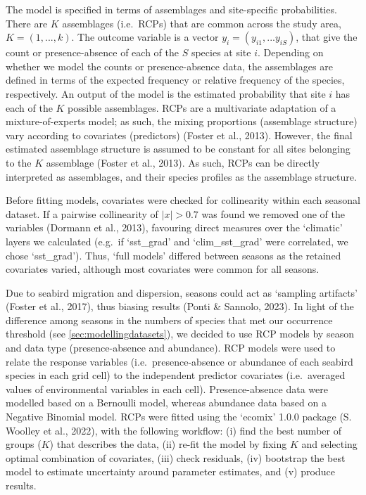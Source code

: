 \documentclass{article}
\begin{document}
The model is specified in terms of assemblages and site-specific probabilities. There are \(K\) assemblages (i.e.~RCPs) that are common across the study area, \(K = (1, ..., k)\). The outcome variable is a vector \(y_{i} = (y_{i1}, ... y_{iS})\), that give the count or presence-absence of each of the \(S\) species at site \(i\). Depending on whether we model the counts or presence-absence data, the assemblages are defined in terms of the expected frequency or relative frequency of the species, respectively. An output of the model is the estimated probability that site \(i\) has each of the \(K\) possible assemblages. RCPs are a multivariate adaptation of a mixture-of-experts model; as such, the mixing proportions (assemblage structure) vary according to covariates (predictors) (Foster et al., 2013). However, the final estimated assemblage structure is assumed to be constant for all sites belonging to the \(K\) assemblage (Foster et al., 2013). As such, RCPs can be directly interpreted as assemblages, and their species profiles as the assemblage structure.

Before fitting models, covariates were checked for collinearity within each seasonal dataset. If a pairwise collinearity of \(\left|x\right| >0.7\) was found we removed one of the variables (Dormann et al., 2013), favouring direct measures over the `climatic' layers we calculated (e.g.~if `sst\_grad' and `clim\_sst\_grad' were correlated, we chose `sst\_grad'). Thus, `full models' differed between seasons as the retained covariates varied, although most covariates were common for all seasons.

Due to seabird migration and dispersion, seasons could act as `sampling artifacts' (Foster et al., 2017), thus biasing results (Ponti \& Sannolo, 2023). In light of the difference among seasons in the numbers of species that met our occurrence threshold (see \ref{sec:modellingdatasets}), we decided to use RCP models by season and data type (presence-absence and abundance). RCP models were used to relate the response variables (i.e.~presence-absence or abundance of each seabird species in each grid cell) to the independent predictor covariates (i.e.~averaged values of environmental variables in each cell). Presence-absence data were modelled based on a Bernoulli model, whereas abundance data based on a Negative Binomial model. RCPs were fitted using the `ecomix' 1.0.0 package (S. Woolley et al., 2022), with the following workflow: (i) find the best number of groups (\(K\)) that describes the data, (ii) re-fit the model by fixing \(K\) and selecting optimal combination of covariates, (iii) check residuals, (iv) bootstrap the best model to estimate uncertainty around parameter estimates, and (v) produce results.
\end{document}

